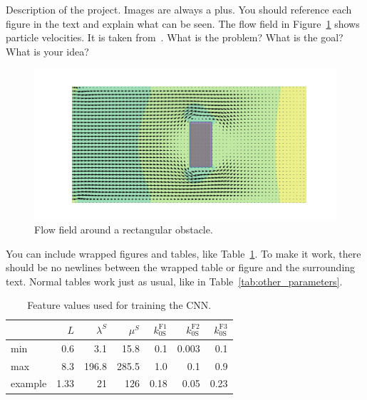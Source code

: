 \documentclass[11pt,table]{article}
\begin{document}
Description of the project. Images are always a plus. You should reference each figure in the text and explain what can be seen. The flow field in Figure~\ref{fig:flow} shows particle velocities. It is taken from~\cite{Author2020}. What is the problem? What is the goal? What is your idea?\\ 

\begin{figure}[h]
	\centering
	\includegraphics[scale=0.9]{Figures/example_cover.png}
	\caption{Flow field around a rectangular obstacle.}
	\label{fig:flow}
\end{figure}


You can include wrapped figures and tables, like Table~\ref{tab:features}. To make it work, there should be no newlines between the wrapped table or figure and the surrounding text. Normal tables work just as usual, like in Table~\ref{tab:other_parameters}.\\
\lipsum[1]

\begin{table}
	\begin{tabular}{@{} lrrrrrr @{}}
		\toprule
		 & $L$ & $\lambda^S$ & $\mu^S$ & $k_{0\text{S}}^{\text{F}1}$ & $k_{0\text{S}}^{\text{F}2}$ & $k_{0\text{S}}^{\text{F}3}$ \\
		\midrule
		min & 0.6 & 3.1 & 15.8 & 0.1 & 0.003 & 0.1 \\
		max & 8.3 & 196.8 & 285.5 & 1.0 & 0.1 & 0.9 \\
		example & 1.33 & 21 & 126 & 0.18 & 0.05 & 0.23 \\
		\bottomrule
	\end{tabular}
	\caption{Feature values used for training the CNN.}\label{tab:features}
\end{table} 
\end{document}
